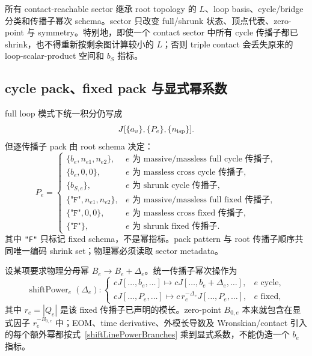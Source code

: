 ﻿\documentclass[a4paper,11pt]{article}
\begin{document}
所有 contact-reachable sector 继承 root topology 的 $L$、loop basis、cycle/bridge 分类和传播子幂次 schema。sector 只改变 full/shrunk 状态、顶点代表、zero-point 与 symmetry。特别地，即使一个 contact sector 中所有 cycle 传播子都已 shrink，也不得重新按剩余图计算较小的 $L$；否则 triple contact 会丢失原来的 loop-scalar-product 空间和 $b_S$ 指标。

\subsection{cycle pack、fixed pack 与显式幂系数}

full loop 模式下统一积分仍写成
\begin{equation}
 J[\{a_v\},\{P_e\},\{n_{\rm isp}\}].
\end{equation}
但逐传播子 pack 由 root schema 决定：
\begin{equation}
  P_e=
 \begin{cases}
  \{b_e,n_{e1},n_{e2}\},&e\text{ 为 massive/massless full cycle 传播子},\\
  \{b_e,0,0\},&e\text{ 为 massless cross cycle 传播子},\\
  \{b_{S,e}\},&e\text{ 为 shrunk cycle 传播子},\\
  \{\texttt{"F"},n_{e1},n_{e2}\},&e\text{ 为 massive/massless full fixed 传播子},\\
  \{\texttt{"F"},0,0\},&e\text{ 为 massless cross fixed 传播子},\\
  \{\texttt{"F"}\},&e\text{ 为 shrunk fixed 传播子}.
 \end{cases}
 \label{cycleFixedPackSchema}
\end{equation}
其中 \texttt{"F"} 只标记 fixed schema，不是幂指标。pack pattern 与 root 传播子顺序共同唯一编码 shrink set；物理幂必须读取 sector metadata。

设某项要求物理分母幂 $B_e\to B_e+\Delta_e$。统一传播子幂次操作为
\begin{equation}
 \operatorname{shiftPower}_e(\Delta_e):
 \begin{cases}
  cJ[\ldots,b_e,\ldots]\mapsto cJ[\ldots,b_e+\Delta_e,\ldots],&e\text{ cycle},\\
  cJ[\ldots,P_e,\ldots]\mapsto c\,r_e^{-\Delta_e}J[\ldots,P_e,\ldots],&e\text{ fixed},
 \end{cases}
 \label{shiftLinePowerBranches}
\end{equation}
其中 $r_e=|Q_e|$ 是该 fixed 传播子已声明的模长。zero-point $B_{0,e}$ 本来就包含在显式因子 $r_e^{-B_{0,e}}$ 中；EOM、time derivative、外模长导数及 Wronskian/contact 引入的每个额外幂都按式~\eqref{shiftLinePowerBranches} 乘到显式系数，不能伪造一个 $b_e$ 指标。
\end{document}
